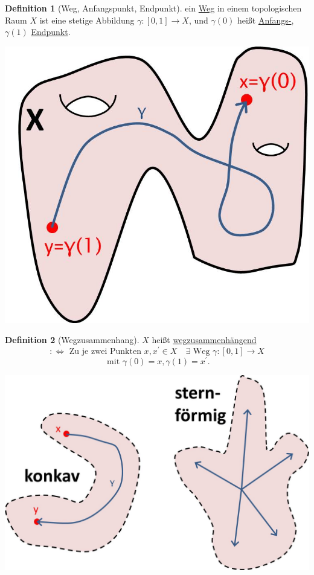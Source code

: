\documentclass[a4paper,11pt,notitlepage]{report}
\theoremstyle{remark}
\theoremstyle{definition}
\newtheorem{definition}{Definition}[chapter]
\begin{document}
\begin{definition}[Weg, Anfangspunkt, Endpunkt]
	ein \underline{Weg} in einem topologischen Raum $X$ ist eine stetige Abbildung $\gamma \colon [0,1] \rightarrow X$, und $\gamma(0)$ heißt \underline{Anfangs-}, $\gamma(1)$ \underline{Endpunkt}.
	\newline
\end{definition}
\begin{center}
	\includegraphics[scale=0.4]{images/Weg.jpg}
\end{center}

\begin{definition}[Wegzusammenhang]
	$X$ heißt \underline{wegzusammenhängend} $$:\Leftrightarrow \text{ Zu je zwei Punkten } x,x^\prime \in X \quad \exists \text{ Weg } \gamma \colon [0,1] \rightarrow X$$ $$\text{ mit } \gamma(0)=x, \gamma(1)=x^\prime.$$
\end{definition}
\begin{center}
\includegraphics[scale=0.4]{images/Wegzshgd.jpg}
\end{center}
\end{document}
